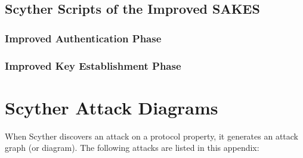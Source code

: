 \section{Scyther Scripts of the Improved SAKES}

\subsection{Improved Authentication Phase}
\label{app:sakes-fixed-auth}


\subsection{Improved Key Establishment Phase}
\label{app:sakes-fixed-keys}


\chapter{Scyther Attack Diagrams}
\label{app:attacks}

When Scyther discovers an attack on a protocol property, it generates an attack graph (or diagram). The following attacks are listed in this appendix:

